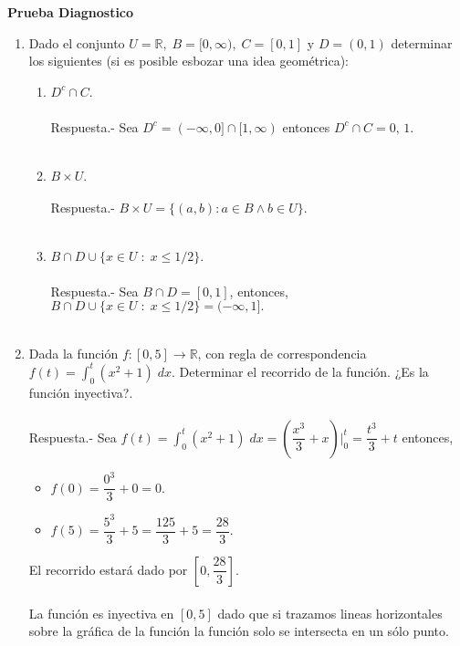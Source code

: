 
\begin{center}
    \Large\textbf{Prueba Diagnostico}
\end{center}

\begin{enumerate}[\bfseries 1.]

    \item Dado el conjunto $U=\mathbb{R},\; B=[0,\infty),\; C=[0,1]$ y $D=(0,1)$ determinar los siguientes (si es posible esbozar una idea geométrica):\\

	\begin{enumerate}[\bfseries a)]

	    \item $D^c \cap C$.\\\\
		Respuesta.-\; Sea $D^c = (-\infty, 0]\cap [1,\infty)$ entonces 
		$D^c \cap C = 0,\, 1.$\\\\

	    \item $B\times U.$\\\\
		Respuesta.-\; $B\times U = \lbrace (a,b): a\in B \land b\in U \rbrace.$\\\\

	    \item $B\cap D \cup \lbrace x\in U\; :\; x\leq 1/2\rbrace .$\\\\
		Respuesta.-\; Sea $B\cap D = [0,1]$, entonces,
		$B\cap D \cup \lbrace x\in U\; :\; x\leq 1/2\rbrace = (-\infty,1].$\\\\

	\end{enumerate}

    \item Dada la función $f:[0,5]\rightarrow \mathbb{R}$, con regla de correspondencia $f(t)=\int_0^t (x^2+1)\; dx.$ Determinar el recorrido de la función. ¿Es la función inyectiva?.\\\\
	Respuesta.-\; Sea $f(t) = \displaystyle\int_0^{t} (x^2+1)\; dx = \left(\dfrac{x^3}{3} + x\right)\bigg|_0^t = \dfrac{t^3}{3} + t$ entonces,
	\begin{itemize}
	    \item $f(0) = \dfrac{0^3}{3} + 0 = 0.$
	    \item $f(5) = \dfrac{5^3}{3} + 5 = \dfrac{125}{3} + 5 = \dfrac{28}{3}.$
	\end{itemize}
	El recorrido estará dado por $\left[0,\dfrac{28}{3}\right]$.\\\\
	La función es inyectiva en $[0,5]$ dado que si trazamos lineas horizontales sobre la gráfica de la función la función solo se intersecta en un sólo punto.\\\\


\end{enumerate}
